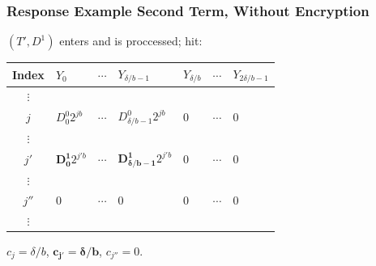 \documentclass{beamer}
\makeatletter
\DeclareRobustCommand*{\&}{%
  \nfss@text{%
    \fontfamily{LinuxBiolinumT-TLF}%
    \selectfont
    \symbol{`\&}%
  }%
}
\makeatother
\begin{document}
\begin{frame}
  \frametitle{Response Example Second Term, Without Encryption}
  $(T', D^1)$ enters and is proccessed; hit:
  \begin{center}
  \begin{tabular}{c  C{1.55cm}  c  C{1.55cm}  C{1.55cm}  c  C{1.55cm}  }
     {\scriptsize Index}             & $Y_0$\qquad            & $\cdots$\qquad         & $Y_{\delta/b-1}$\qquad & $Y_{\delta/b}$\qquad   & $\cdots$\qquad         & $Y_{2\delta/b-1}$\qquad\\\toprule
     $\vdots$ & \\
     {\footnotesize$j$} & {\footnotesize ${D^0_0} 2^{jb}$}                         & $\cdots$                         & {\footnotesize ${D^0_{\delta/b-1}} 2^{jb}$}                      & 0                         & $\cdots$                         & 0                         \\
     $\vdots$ & \\
     {\footnotesize$j'$}  & {\footnotesize $\bm{D^1_0} 2^{j'b}$} & $\cdots$                           & {\footnotesize $\bm{D^1_{\delta/b-1}} 2^{j'b}$}                           & 0                      & $\cdots$                           & 0\\
     $\vdots$ & \\
     {\footnotesize$j''$}  & 0 & $\cdots$                           & 0         & 0                      & $\cdots$                           & 0\\
    $\vdots$ & \\\bottomrule
  \end{tabular}
  \end{center}
  $c_{j} = \delta/b$, $\bm{c_{j'} = \delta/b}$, $c_{j''} = 0$.
\end{frame}
\end{document}
